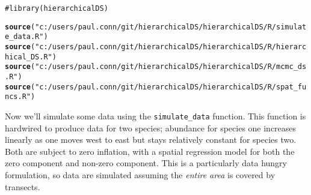 \documentclass{article}\usepackage{graphicx, color}
\makeatletter
\newcommand{\hlfunctioncall}[1]{\textcolor[rgb]{0.501960784313725,0,0.329411764705882}{\textbf{#1}}}%
\newcommand{\hlstring}[1]{\textcolor[rgb]{0.6,0.6,1}{#1}}%
\newcommand{\hlcomment}[1]{\textcolor[rgb]{0.180392156862745,0.6,0.341176470588235}{#1}}%
\newenvironment{kframe}{%
 \def\at@end@of@kframe{}%
 \ifinner\ifhmode%
  \def\at@end@of@kframe{\end{minipage}}%
  \begin{minipage}{\columnwidth}%
 \fi\fi%
 \def\FrameCommand##1{\hskip\@totalleftmargin \hskip-\fboxsep
 \colorbox{shadecolor}{##1}\hskip-\fboxsep
     \hskip-\linewidth \hskip-\@totalleftmargin \hskip\columnwidth}%
 \MakeFramed {\advance\hsize-\width
   \@totalleftmargin\z@ \linewidth\hsize
   \@setminipage}}%
 {\par\unskip\endMakeFramed%
 \at@end@of@kframe}
\newenvironment{knitrout}{}{} %
\makeatother
\begin{document}
\begin{knitrout}
\color{fgcolor}\begin{kframe}
\begin{alltt}
\hlcomment{# library(hierarchicalDS)}
\end{alltt}
\end{kframe}
\end{knitrout}


\begin{knitrout}
\color{fgcolor}\begin{kframe}
\begin{alltt}
\hlfunctioncall{source}(\hlstring{"c:/users/paul.conn/git/hierarchicalDS/hierarchicalDS/R/simulate_data.R"})
\hlfunctioncall{source}(\hlstring{"c:/users/paul.conn/git/hierarchicalDS/hierarchicalDS/R/hierarchical_DS.R"})
\hlfunctioncall{source}(\hlstring{"c:/users/paul.conn/git/hierarchicalDS/hierarchicalDS/R/mcmc_ds.R"})
\hlfunctioncall{source}(\hlstring{"c:/users/paul.conn/git/hierarchicalDS/hierarchicalDS/R/spat_funcs.R"})
\end{alltt}
\end{kframe}
\end{knitrout}



Now we'll
simulate some data using the \texttt{simulate\_data} function.  This
function is hardwired to produce data for two species; abundance for species one increases linearly as one moves west to east but stays relatively constant for species two.  Both are subject to zero inflation, with a spatial regression model for both the zero component and non-zero component.  This is a particularly data hungry formulation, so data are simulated assuming the {\it entire area} is covered by transects.
\end{document}
